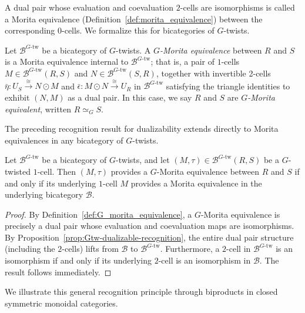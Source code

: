\documentclass[11pt,oneside]{amsart}
\numberwithin{equation}{section}
\numberwithin{figure}{section}
\theoremstyle{plain}
\theoremstyle{definition}
\theoremstyle{remark}
\begin{document}
  A dual pair whose evaluation and coevaluation $2$-cells are isomorphisms is called a Morita equivalence (Definition~\ref{def:morita_equivalence}) between the corresponding $0$-cells. We formalize this for bicategories of $G$-twists.  

\begin{definition}\label{def:G_morita_equivalence}
Let \(\mathcal{B}^{G\text{-tw}}\) be a bicategory of \(G\)-twists. A \emph{\(G\)-Morita equivalence} between \(R\) and \(S\) is a Morita equivalence internal to \(\mathcal{B}^{G\text{-tw}}\); that is, a pair of \(1\)-cells \(M\in\mathcal{B}^{G\text{-tw}}(R,S)\) and \(N\in\mathcal{B}^{G\text{-tw}}(S,R)\), together with invertible 2-cells \(\bar\eta\colon U_S \xrightarrow{\cong} N\odot M\) and \(\bar\epsilon\colon M\odot N \xrightarrow{\cong} U_R\) in \(\mathcal{B}^{G\text{-tw}}\) satisfying the triangle identities to exhibit \((N,M)\) as a dual pair. In this case, we say \(R\) and \(S\) are \emph{\(G\)-Morita equivalent}, written \(R\simeq_G S\).
\end{definition}

The preceding recognition result for dualizability extends directly to Morita equivalences in any bicategory of \(G\)-twists.

\begin{cor}\label{cor:general_morita_recognition}
Let \(\mathcal{B}^{G\text{-tw}}\) be a bicategory of \(G\)-twists, and let \((M,\tau) \in \mathcal{B}^{G\text{-tw}}(R,S)\) be a \(G\)-twisted \(1\)-cell. Then \((M,\tau)\) provides a \(G\)-Morita equivalence between \(R\) and \(S\) if and only if its underlying \(1\)-cell \(M\) provides a Morita equivalence in the underlying bicategory \(\mathcal{B}\).
\end{cor}

\begin{proof}
By Definition~\ref{def:G_morita_equivalence}, a \(G\)-Morita equivalence is precisely a dual pair whose evaluation and coevaluation maps are isomorphisms. By Proposition~\ref{prop:Gtw-dualizable-recognition}, the entire dual pair structure (including the \(2\)-cells) lifts from \(\mathcal{B}\) to \(\mathcal{B}^{G\text{-tw}}\). Furthermore, a \(2\)-cell in \(\mathcal{B}^{G\text{-tw}}\) is an isomorphism if and only if its underlying \(2\)-cell is an isomorphism in \(\mathcal{B}\). The result follows immediately.
\end{proof}

We illustrate this general recognition principle through biproducts in closed symmetric monoidal categories.
\end{document}
